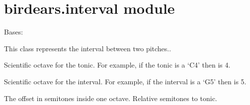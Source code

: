 \documentclass[letterpaper,10pt,english]{sphinxmanual}
\begin{document}
\section{birdears.interval module}
\label{\detokenize{birdears:module-birdears.interval}}\label{\detokenize{birdears:birdears-interval-module}}

\begin{fulllineitems}
\label{\detokenize{birdears:birdears.interval.Interval}}
Bases: 

This class represents the interval between two pitches..

\begin{fulllineitems}
\label{\detokenize{birdears:birdears.interval.Interval.tonic_octave}}
 \textendash{} Scientific octave for the tonic. For example, if
the tonic is a ‘C4’ then  is 4.

\end{fulllineitems}



\begin{fulllineitems}
 \textendash{} Scientific octave for the interval. For example,
if the interval is a ‘G5’ then  is 5.

\end{fulllineitems}


\begin{fulllineitems}
\label{\detokenize{birdears:birdears.interval.Interval.chromatic_offset}}
 \textendash{} The offset in semitones inside one octave.
Relative semitones to tonic.

\end{fulllineitems}



\end{fulllineitems}
\end{document}
